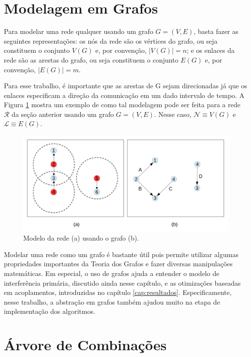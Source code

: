 \section{Modelagem em Grafos}
\label{section:graphs}

Para modelar uma rede qualquer usando um grafo $G=(V,E)$, basta fazer as seguintes representações: os nós da rede são os vértices do grafo, ou seja constituem o conjunto $V(G)$ e, por convenção, $|V(G)|=n$; e os enlaces da rede são as arestas do grafo, ou seja constituem o conjunto $E(G)$ e, por convenção, $|E(G)|=m$.

Para esse trabalho, é importante que as arestas de G sejam direcionadas já que os enlaces especificam a direção da comunicação em um dado intervalo de tempo. A Figura \ref{fig:grafo} mostra um exemplo de como tal modelagem pode ser feita para a rede $\mathcal{R}$ da seção anterior usando um grafo $G=(V,E)$. Nesse caso, $\mathcal{N} \equiv V(G)$ e $\mathcal{L} \equiv E(G)$.

\begin{figure}[htb]
\centering
\includegraphics[width=1\textwidth]{figs/grafo}
\caption[Modelo da rede (a) usando o grafo (b).]
{Modelo da rede (a) usando o grafo (b).}
\label{fig:grafo}
\end{figure}

Modelar uma rede como um grafo é bastante útil pois permite utilizar algumas propriedades importantes da Teoria dos Grafos e fazer diversas manipulações matemáticas. Em especial, o uso de grafos ajuda a entender o modelo de interferência primária, discutido ainda nesse capítulo, e as otimizações baseadas em acoplamentos, introduzidas no capítulo \ref{cap:resultados}. Especificamente, nesse trabalho, a abstração em grafos também ajudou muito na etapa de implementação dos algoritmos.

\section{Árvore de Combinações}
\label{section:trees}

